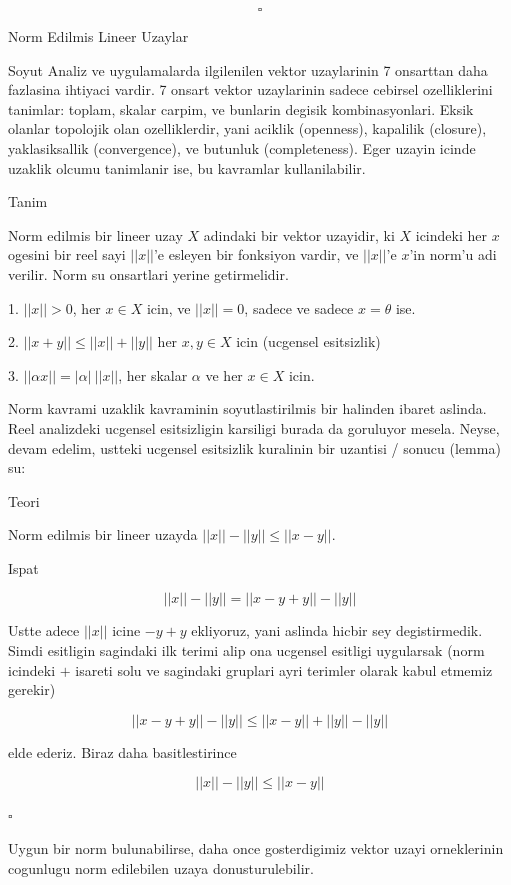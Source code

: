 \documentclass[12pt,fleqn]{article}
\begin{document}
\[ \square \]

Norm Edilmis Lineer Uzaylar

Soyut Analiz ve uygulamalarda ilgilenilen vektor uzaylarinin 7 onsarttan
daha fazlasina ihtiyaci vardir. 7 onsart vektor uzaylarinin sadece cebirsel
ozelliklerini tanimlar: toplam, skalar carpim, ve bunlarin degisik
kombinasyonlari. Eksik olanlar topolojik olan ozelliklerdir, yani aciklik
(openness), kapalilik (closure), yaklasiksallik (convergence), ve butunluk
(completeness). Eger uzayin icinde uzaklik olcumu tanimlanir ise, bu
kavramlar kullanilabilir. 

Tanim

Norm edilmis bir lineer uzay $X$ adindaki bir vektor uzayidir, ki $X$
icindeki her $x$ ogesini bir reel sayi $||x||$'e esleyen bir fonksiyon
vardir, ve $||x||$'e $x$'in norm'u adi verilir. Norm su onsartlari yerine
getirmelidir. 

1. $||x|| > 0$, her $x \in X$ icin, ve $||x|| = 0$, sadece ve sadece $x =
\theta$ ise. 

2. $||x+y|| \le ||x|| + ||y||$ her $x,y \in X$ icin (ucgensel esitsizlik) 

3. $||\alpha x|| = |\alpha| \ ||x||$, her skalar $\alpha$ ve her $x \in X$ icin. 

Norm kavrami uzaklik kavraminin soyutlastirilmis bir halinden ibaret
aslinda. Reel analizdeki ucgensel esitsizligin karsiligi burada da
goruluyor mesela. Neyse, devam edelim, ustteki ucgensel esitsizlik
kuralinin bir uzantisi / sonucu (lemma) su:

Teori 

Norm edilmis bir lineer uzayda $||x|| - ||y|| \le ||x-y||$. 

Ispat

\[ ||x|| - ||y|| = ||x - y + y|| - ||y||\]

Ustte adece $||x||$ icine $-y+y$ ekliyoruz, yani aslinda hicbir sey
degistirmedik. Simdi esitligin sagindaki ilk terimi alip ona ucgensel
esitligi uygularsak (norm icindeki $+$ isareti solu ve sagindaki gruplari
ayri terimler olarak kabul etmemiz gerekir)

\[ ||x - y + y|| - ||y|| \le
||x - y || + ||y|| - ||y|| 
\]

elde ederiz. Biraz daha basitlestirince

\[ ||x|| - ||y||  \le ||x - y ||  \]

$\square$

Uygun bir norm bulunabilirse, daha once gosterdigimiz vektor uzayi
orneklerinin cogunlugu norm edilebilen uzaya donusturulebilir.
\end{document}
